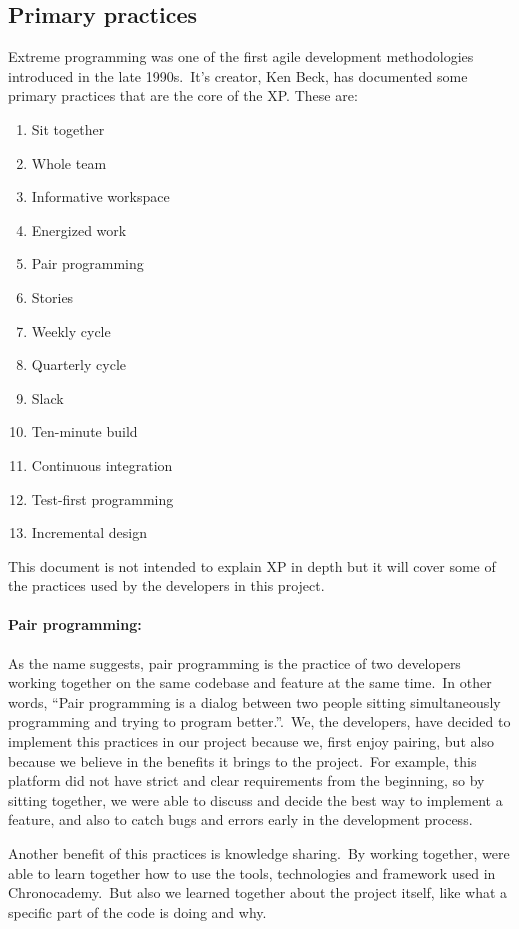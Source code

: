 \subsection{Primary practices}\label{subsec:primary-practices}
Extreme programming was one of the first agile development methodologies introduced in the late 1990s.\ It's creator, Ken Beck, has documented some primary practices that are the core of the XP. These are:
\begin{enumerate}
    \item Sit together
    \item Whole team
    \item Informative workspace
    \item Energized work
    \item Pair programming
    \item Stories
    \item Weekly cycle
    \item Quarterly cycle
    \item Slack
    \item Ten-minute build
    \item Continuous integration
    \item Test-first programming
    \item Incremental design
\end{enumerate}

This document is not intended to explain XP in depth but it will cover some of the practices used by the developers in this project.

\paragraph{Pair programming:} As the name suggests, pair programming is the practice of two developers working together on the same codebase and feature at the same time.\ In other words, ``Pair programming is a dialog between two people sitting simultaneously programming and trying to program better.''\cite[Extreme Programming]{xp}.\ We, the developers, have decided to implement this practices in our project because we, first enjoy pairing, but also because we believe in the benefits it brings to the project.\ For example, this platform did not have strict and clear requirements from the beginning, so by sitting together, we were able to discuss and decide the best way to implement a feature, and also to catch bugs and errors early in the development process.

Another benefit of this practices is knowledge sharing.\ By working together, were able to learn together how to use the tools, technologies and framework used in Chronocademy.\ But also we learned together about the project itself, like what a specific part of the code is doing and why.


